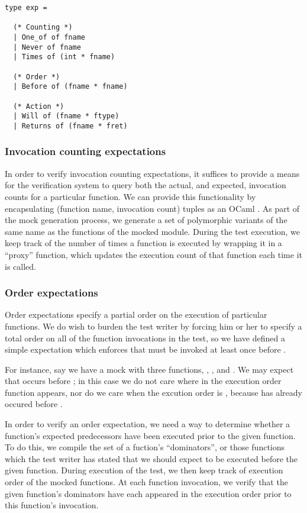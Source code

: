 \begin{lstlisting}[aboveskip=\baselineskip,
    caption=The expectation type,
    label=code:expect_type]
type exp =

  (* Counting *)
  | One_of of fname
  | Never of fname
  | Times of (int * fname)

  (* Order *)
  | Before of (fname * fname)

  (* Action *)
  | Will of (fname * ftype)
  | Returns of (fname * fret)
\end{lstlisting}

\subsubsection{Invocation counting expectations}

In order to verify invocation counting expectations, it suffices to
provide a means for the verification system to query both the actual,
and expected, invocation counts for a particular function. We can
provide this functionality by encapsulating (function name, invocation
count) tuples as an OCaml . As part of the mock generation
process, we generate a set of polymorphic variants of the same name as
the functions of the mocked module. During the test execution, we keep
track of the number of times a function is executed by wrapping it in
a ``proxy'' function, which updates the execution count of that
function each time it is called.

\subsubsection{Order expectations}

Order expectations specify a partial order on the execution of
particular functions. We do wish to burden the test writer by forcing
him or her to specify a total order on all of the function invocations
in the test, so we have defined a simple  expectation
which enforces that  must be invoked at least once before
.

For instance, say we have a mock with three functions, ,
, and . We may expect that  occurs before
; in this case we do not care where in the execution order
function  appears, nor do we care when the excution order is
, because  has already occured before .

In order to verify an order expectation, we need a way to determine
whether a function's expected predecessors have been executed prior to
the given function. To do this, we compile the set of a fuction's
``dominators'', or those functions which the test writer has stated
that we should expect to be executed before the given function. During
execution of the test, we then keep track of execution order of the
mocked functions. At each function invocation, we verify that the
given function's dominators have each appeared in the execution order
prior to this function's invocation.


